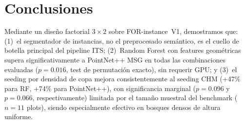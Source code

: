 \documentclass[runningheads]{llncs}
\begin{document}
\section{Conclusiones}\label{sec:conclusions}

Mediante un dise\~no factorial $3 \times 2$ sobre FOR-instance~V1, demostramos que: (1)~el segmentador de instancias, no el preprocesado sem\'antico, es el cuello de botella principal del pipeline ITS; (2)~Random Forest con features geom\'etricas supera significativamente a PointNet++ MSG en todas las combinaciones evaluadas ($p=0.016$, test de permutaci\'on exacto), sin requerir GPU; y (3)~el seeding por densidad de copa mejora consistentemente al seeding CHM (+47\% para RF, +74\% para PointNet++), con significancia marginal ($p=0.096$ y $p=0.066$, respectivamente) limitada por el tama\~no muestral del benchmark ($n=11$ plots), siendo especialmente efectivo en bosques densos de altura uniforme.
\end{document}

